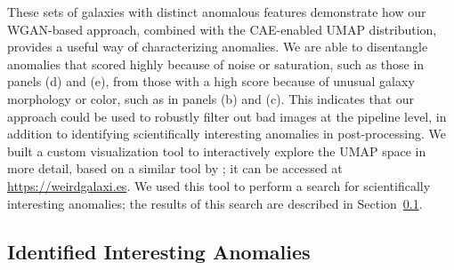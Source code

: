 These sets of galaxies with distinct anomalous features demonstrate how our WGAN-based approach, combined with the CAE-enabled UMAP distribution, provides a useful way of characterizing anomalies.
We are able to disentangle anomalies that scored highly because of noise or saturation, such as those in panels (d) and (e), from those with a high score because of unusual galaxy morphology or color, such as in panels (b) and (c).
This indicates that our approach could be used to robustly filter out bad images at the pipeline level, in addition to identifying scientifically interesting anomalies in post-processing.
We built a custom visualization tool to interactively explore the UMAP space in more detail, based on a similar tool by \cite{Reis2021}; it can be accessed at \url{https://weirdgalaxi.es}.
We used this tool to perform a search for scientifically interesting anomalies; the results of this search are described in Section~\ref{sec:interesting}.


\subsection{Identified Interesting Anomalies}
\label{sec:interesting}

